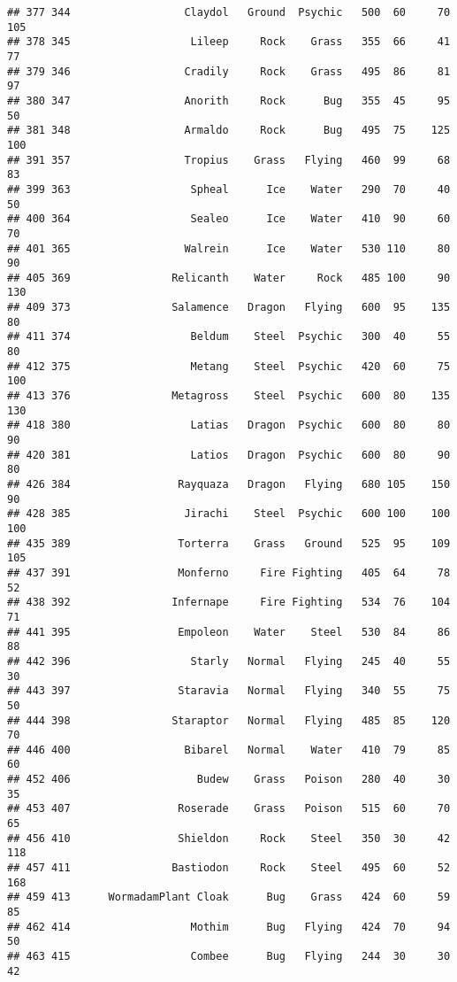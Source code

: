 \documentclass[
]{article}
\begin{document}
\begin{verbatim}
## 377 344                  Claydol   Ground  Psychic   500  60     70     105
## 378 345                   Lileep     Rock    Grass   355  66     41      77
## 379 346                  Cradily     Rock    Grass   495  86     81      97
## 380 347                  Anorith     Rock      Bug   355  45     95      50
## 381 348                  Armaldo     Rock      Bug   495  75    125     100
## 391 357                  Tropius    Grass   Flying   460  99     68      83
## 399 363                   Spheal      Ice    Water   290  70     40      50
## 400 364                   Sealeo      Ice    Water   410  90     60      70
## 401 365                  Walrein      Ice    Water   530 110     80      90
## 405 369                Relicanth    Water     Rock   485 100     90     130
## 409 373                Salamence   Dragon   Flying   600  95    135      80
## 411 374                   Beldum    Steel  Psychic   300  40     55      80
## 412 375                   Metang    Steel  Psychic   420  60     75     100
## 413 376                Metagross    Steel  Psychic   600  80    135     130
## 418 380                   Latias   Dragon  Psychic   600  80     80      90
## 420 381                   Latios   Dragon  Psychic   600  80     90      80
## 426 384                 Rayquaza   Dragon   Flying   680 105    150      90
## 428 385                  Jirachi    Steel  Psychic   600 100    100     100
## 435 389                 Torterra    Grass   Ground   525  95    109     105
## 437 391                 Monferno     Fire Fighting   405  64     78      52
## 438 392                Infernape     Fire Fighting   534  76    104      71
## 441 395                 Empoleon    Water    Steel   530  84     86      88
## 442 396                   Starly   Normal   Flying   245  40     55      30
## 443 397                 Staravia   Normal   Flying   340  55     75      50
## 444 398                Staraptor   Normal   Flying   485  85    120      70
## 446 400                  Bibarel   Normal    Water   410  79     85      60
## 452 406                    Budew    Grass   Poison   280  40     30      35
## 453 407                 Roserade    Grass   Poison   515  60     70      65
## 456 410                 Shieldon     Rock    Steel   350  30     42     118
## 457 411                Bastiodon     Rock    Steel   495  60     52     168
## 459 413      WormadamPlant Cloak      Bug    Grass   424  60     59      85
## 462 414                   Mothim      Bug   Flying   424  70     94      50
## 463 415                   Combee      Bug   Flying   244  30     30      42

\end{verbatim}
\end{document}
